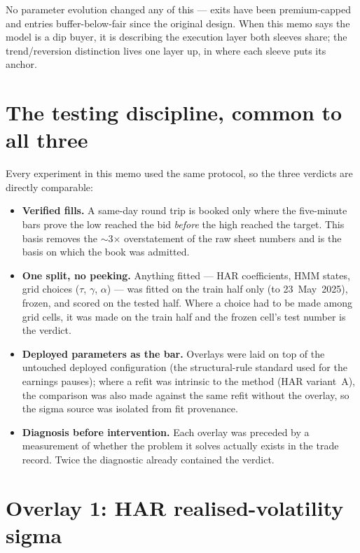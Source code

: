 \documentclass[11pt,a4paper]{article}
\begin{document}
\begin{tcolorbox}[colback=bcnavy!5, colframe=bcnavy, boxrule=0.8pt,
  title={\bfseries But aren't the sleeves a trend follower and a mean-reverter?},
  coltitle=white]
\vspace{0.1cm}
No parameter evolution changed any of this --- exits have been premium-capped and
entries buffer-below-fair since the original design. When this memo says the
model is a dip buyer, it is describing the execution layer both sleeves share;
the trend/reversion distinction lives one layer up, in where each sleeve puts
its anchor.
\end{tcolorbox}

\section{The testing discipline, common to all three}

Every experiment in this memo used the same protocol, so the three verdicts are
directly comparable:

\begin{itemize}
\item \textbf{Verified fills.} A same-day round trip is booked only where the
five-minute bars prove the low reached the bid \emph{before} the high reached the
target. This basis removes the $\sim$3$\times$ overstatement of the raw sheet
numbers and is the basis on which the book was admitted.
\item \textbf{One split, no peeking.} Anything fitted --- HAR coefficients, HMM
states, grid choices ($\tau$, $\gamma$, $\alpha$) --- was fitted on the train half
only (to 23~May~2025), frozen, and scored on the tested half. Where a choice had
to be made among grid cells, it was made on the train half and the frozen cell's
test number is the verdict.
\item \textbf{Deployed parameters as the bar.} Overlays were laid on top of the
untouched deployed configuration (the structural-rule standard used for the
earnings pauses); where a refit was intrinsic to the method (HAR variant~A), the
comparison was also made against the same refit without the overlay, so the
sigma source was isolated from fit provenance.
\item \textbf{Diagnosis before intervention.} Each overlay was preceded by a
measurement of whether the problem it solves actually exists in the trade record.
Twice the diagnostic already contained the verdict.
\end{itemize}

\section{Overlay 1: HAR realised-volatility sigma}
\end{document}
